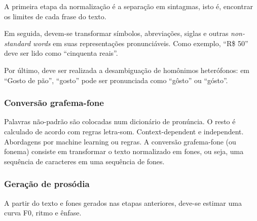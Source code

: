 A primeira etapa da normalização é a separação em sintagmas, isto é, encontrar os
limites de cada frase do texto. 

Em seguida, devem-se transformar símbolos, abreviações, siglas e outras
\emph{non-standard words} em suas representações pronunciáveis. Como exemplo, ``R\$
50'' deve ser lido como ``cinquenta reais''.

Por último, deve ser realizada a desambiguação de homônimos heterófonos: em
``Gosto de pão'', ``gosto'' pode ser pronunciada como ``gôsto'' ou ``gósto''.

\subsubsection{Conversão grafema-fone}
Palavras não-padrão são colocadas num dicionário de pronúncia. O resto é
calculado de acordo com regras letra-som.
Context-dependent e independent. Abordagens por machine learning ou regras.
A conversão grafema-fone (ou fonema) consiste em transformar o texto normalizado
em fones, ou seja, uma sequência de caracteres em uma sequência de fones.

\subsubsection{Geração de prosódia}
A partir do texto e fones gerados nas etapas anteriores, deve-se estimar uma
curva F0, ritmo e ênfase.



